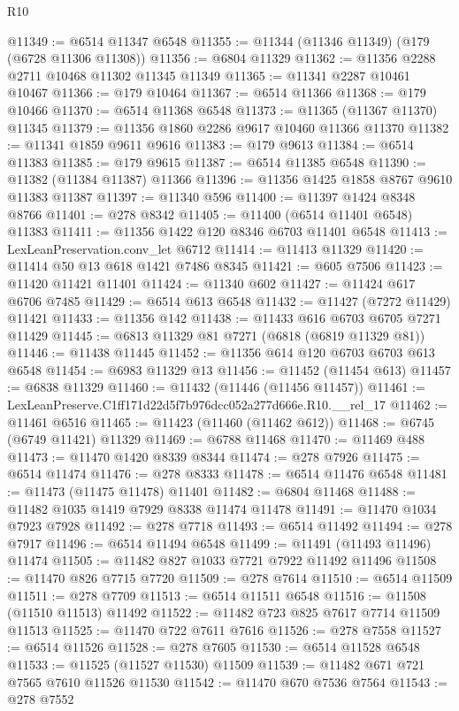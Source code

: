 \begin{lexlean}{R10}
\begin{coremodule}
@11349 := @6514 @11347 @6548
@11355 := @11344 (@11346 @11349) (@179 (@6728 @11306 @11308))
@11356 := @6804 @11329
@11362 := @11356 @2288 @2711 @10468 @11302 @11345 @11349
@11365 := @11341 @2287 @10461 @10467
@11366 := @179 @10464
@11367 := @6514 @11366
@11368 := @179 @10466
@11370 := @6514 @11368 @6548
@11373 := @11365 (@11367 @11370) @11345
@11379 := @11356 @1860 @2286 @9617 @10460 @11366 @11370
@11382 := @11341 @1859 @9611 @9616
@11383 := @179 @9613
@11384 := @6514 @11383
@11385 := @179 @9615
@11387 := @6514 @11385 @6548
@11390 := @11382 (@11384 @11387) @11366
@11396 := @11356 @1425 @1858 @8767 @9610 @11383 @11387
@11397 := @11340 @596
@11400 := @11397 @1424 @8348 @8766
@11401 := @278 @8342
@11405 := @11400 (@6514 @11401 @6548) @11383
@11411 := @11356 @1422 @120 @8346 @6703 @11401 @6548
@11413 := LexLeanPreservation.conv_let @6712
@11414 := @11413 @11329
@11420 := @11414 @50 @13 @618 @1421 @7486 @8345
@11421 := @605 @7506
@11423 := @11420 @11421 @11401
@11424 := @11340 @602
@11427 := @11424 @617 @6706 @7485
@11429 := @6514 @613 @6548
@11432 := @11427 (@7272 @11429) @11421
@11433 := @11356 @142
@11438 := @11433 @616 @6703 @6705 @7271 @11429
@11445 := @6813 @11329 @81 @7271 (@6818 (@6819 @11329 @81))
@11446 := @11438 @11445
@11452 := @11356 @614 @120 @6703 @6703 @613 @6548
@11454 := @6983 @11329 @13
@11456 := @11452 (@11454 @613)
@11457 := @6838 @11329
@11460 := @11432 (@11446 (@11456 @11457))
@11461 := LexLeanPreserve.C1ff171d22d5f7b976dcc052a277d666e.R10.__rel_17
@11462 := @11461 @6516
@11465 := @11423 (@11460 (@11462 @612))
@11468 := @6745 (@6749 @11421) @11329
@11469 := @6788 @11468
@11470 := @11469 @488
@11473 := @11470 @1420 @8339 @8344
@11474 := @278 @7926
@11475 := @6514 @11474
@11476 := @278 @8333
@11478 := @6514 @11476 @6548
@11481 := @11473 (@11475 @11478) @11401
@11482 := @6804 @11468
@11488 := @11482 @1035 @1419 @7929 @8338 @11474 @11478
@11491 := @11470 @1034 @7923 @7928
@11492 := @278 @7718
@11493 := @6514 @11492
@11494 := @278 @7917
@11496 := @6514 @11494 @6548
@11499 := @11491 (@11493 @11496) @11474
@11505 := @11482 @827 @1033 @7721 @7922 @11492 @11496
@11508 := @11470 @826 @7715 @7720
@11509 := @278 @7614
@11510 := @6514 @11509
@11511 := @278 @7709
@11513 := @6514 @11511 @6548
@11516 := @11508 (@11510 @11513) @11492
@11522 := @11482 @723 @825 @7617 @7714 @11509 @11513
@11525 := @11470 @722 @7611 @7616
@11526 := @278 @7558
@11527 := @6514 @11526
@11528 := @278 @7605
@11530 := @6514 @11528 @6548
@11533 := @11525 (@11527 @11530) @11509
@11539 := @11482 @671 @721 @7565 @7610 @11526 @11530
@11542 := @11470 @670 @7536 @7564
@11543 := @278 @7552

\end{coremodule}
\end{lexlean}
